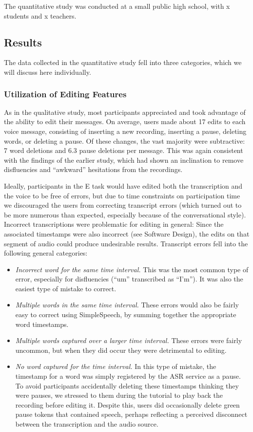 The quantitative study was conducted at a small public high school, with x students and x teachers.

\subsection{Results}
The data collected in the quantitative study fell into three categories, which we will discuss here individually.

\subsubsection{Utilization of Editing Features}
As in the qualitative study, most participants appreciated and took advantage of the ability to edit their messages.
On average, users made about 17 edits to each voice message, consisting of inserting a new recording, inserting a pause, deleting words, or deleting a pause. 
Of these changes, the vast majority were subtractive: 7 word deletions and 6.3 pause deletions per message.
This was again consistent with the findings of the earlier study, which had shown an inclination to remove disfluencies and ``awkward'' hesitations from the recordings.

Ideally, participants in the E task would have edited both the transcription and the voice to be free of errors, but due to time constraints on participation time we discouraged the users from correcting transcript errors (which turned out to be more numerous than expected, especially because of the conversational style).
Incorrect transcriptions were problematic for editing in general: Since the associated timestamps were also incorrect (see Software Design), the edits on that segment of audio could produce undesirable results. 
Transcript errors fell into the following general categories:

\begin{itemize}
	\item \emph{Incorrect word for the same time interval.} 
	This was the most common type of error, especially for disfluencies (``um'' transcribed as ``I'm''). 
	It was also the easiest type of mistake to correct.
	\item \emph{Multiple words in the same time interval.}
	These errors would also be fairly easy to correct using SimpleSpeech, by summing together the appropriate word timestamps.
	\item \emph{Multiple words captured over a larger time interval.}
	These errors were fairly uncommon, but when they did occur they were detrimental to editing.
	\item \emph{No word captured for the time interval.}
	In this type of mistake, the timestamp for a word was simply registered by the ASR service as a pause.
	To avoid participants accidentally deleting these timestamps thinking they were pauses, we stressed to them during the tutorial to play back the recording before editing it. 
	Despite this, users did occasionally delete green pause tokens that contained speech, perhaps reflecting a perceived disconnect between the transcription and the audio source.
\end{itemize}

